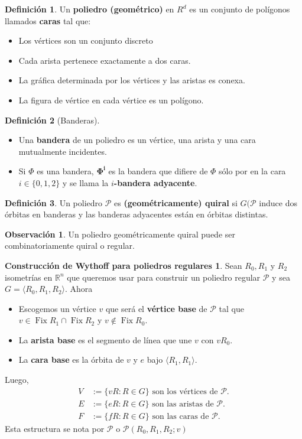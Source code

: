 \documentclass[spanish]{article}
\theoremstyle{definition}
\newtheorem*{defn}{Definición}
\newtheorem*{obs}{Observación}
\newtheorem*{Wreg}{Construcción de Wythoff para poliedros regulares}
\newcommand{\R}{\mathbb{R}}
\newcommand{\p}{\mathcal{P}}
\DeclareMathOperator{\Fix}{Fix}
\begin{document}
	\begin{defn}
		Un \textbf{poliedro (geométrico)} en $R^d$ es un conjunto de polígonos llamados \textbf{caras} tal que:
		\begin{itemize}
			\item Los vértices son un conjunto discreto
			\item Cada arista pertenece exactamente a dos caras.
			\item La gráfica determinada por los vértices y las aristas es conexa.
			\item La figura de vértice en cada vértice es un polígono.
		\end{itemize}
	\end{defn}
	
	\begin{defn}[Banderas]\leavevmode
		\begin{itemize}
			\item 	Una \textbf{bandera} de un poliedro es un vértice, una arista y una cara mutualmente incidentes.
			\item Si $\Phi$ es una bandera, $\mathbf{\Phi^i}$ es la bandera que difiere de $\Phi$ sólo por en la cara $i\in\{0,1,2\}$ y se llama la $i$\textbf{-bandera adyacente}.
		\end{itemize}
	\end{defn}
	
	\begin{defn}
		Un poliedro $\mathcal{P}$ es \textbf{(geométricamente) quiral} si $G(\mathcal{P}$ induce dos órbitas en banderas y las banderas adyacentes están en órbitas distintas.
	\end{defn}
	\begin{obs}
		Un poliedro geométricamente quiral puede ser combinatoriamente quiral o regular.
	\end{obs}
	
	\begin{Wreg}Sean $R_0,R_1$ y $R_2$ isometrías en $\R^n$ que queremos usar para construir un poliedro regular $\p$  y sea $G=\langle R_0,R_1,R_2\rangle$. Ahora
		\begin{itemize}
			\item Escogemos un vértice $v$ que será el \textbf{vértice base} de $\p$ tal que $v\in\Fix R_1\cap\Fix R_2$ y $v\notin\Fix R_0$.
			\item La \textbf{arista base} es el segmento de línea que une $v$ con $vR_0$.
			\item La \textbf{cara base} es la órbita de $v$ y $e$ bajo $\langle R_1,R_1\rangle$.
		\end{itemize}
		Luego,
		\begin{align*}
			V&:=\{vR:R\in G\}\text{ son los vértices de } \p.\\ 
			E&:=\{eR:R\in G\} \text{ son las aristas de } \p.\\ 
			F&:=\{fR:R\in G\} \text{ son las caras de } \p.
		\end{align*}
		Esta estructura se nota por $\p$ o $\p(R_0,R_1,R_2;v)$
	\end{Wreg}
	
\end{document}
